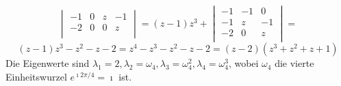 \begin{flushenum}
\begin{itemize}
\[\begin{vmatrix}
					-1 & 0 & z & -1 \\
					-2 & 0 & 0 & z \\
				\end{vmatrix} = 
				(z-1) z^3 + 
					\begin{vmatrix}
						-1 & -1 & 0 \\
						-1 & z & -1 \\
						-2 & 0 & z \\
					\end{vmatrix} = \] \[
				(z-1)z^3 - z^2 - z  - 2 =
				z^4 - z^3 - z^2 - z - 2 =
				(z-2)(z^3 + z^2 + z + 1) \]
			Die Eigenwerte sind $\lambda_1 = 2, \lambda_2 = \omega_4, \lambda_3 = \omega_4^2, \lambda_4 = \omega_4^3$,
			wobei $\omega_4$ die vierte Einheitswurzel $e^{\imath 2 \pi / 4} = \imath$ ist.
	\end{itemize}


\end{flushenum}
